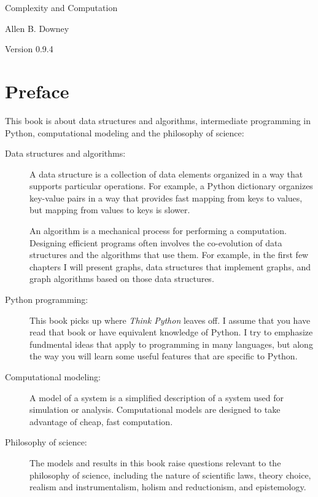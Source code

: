 \documentclass[10pt]{book}
\newcommand{\thetitle}{Complexity and Computation}
\newcommand{\theversion}{0.9.4}
\begin{document}

\begin{htmlonly}


{\Large \thetitle}

{\large Allen B. Downey}

Version \theversion

\setcounter{chapter}{-1}

\end{htmlonly}

\chapter{Preface}

This book is about data structures and algorithms, intermediate
programming in Python, computational modeling and
the philosophy of science:

\begin{description}

\item[Data structures and algorithms:] A data structure is a
  collection of data elements organized in a way that supports
  particular operations.  For example, a Python dictionary organizes
  key-value pairs in a way that provides fast mapping from keys to
  values, but mapping from values to keys is slower.

An algorithm is a mechanical process for performing a computation.
Designing efficient programs often involves the co-evolution of data
structures and the algorithms that use them.  For example, in the
first few chapters I will present graphs, data structures that
implement graphs, and graph algorithms based on those data structures.

\item[Python programming:] This book picks up where {\em Think Python}
  leaves off.  I assume that you have read that book or have
  equivalent knowledge of Python.  I try to emphasize fundmental ideas
  that apply to programming in many languages, but along the way you
  will learn some useful features that are specific to Python.

\item[Computational modeling:] A model of a system is a simplified
  description of a system used for simulation or analysis.
  Computational models are designed to take advantage of cheap, fast
  computation.

\item[Philosophy of science:] The models and results in this book
  raise questions relevant to the philosophy of science,
  including the nature of scientific laws, theory choice, realism and
  instrumentalism, holism and reductionism, and epistemology.

\end{description}
\end{document}
